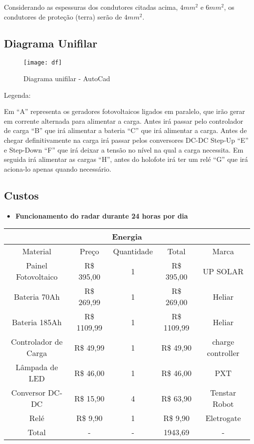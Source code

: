 Considerando as espessuras dos condutores citadas acima, $4mm^2$ e $6mm^2$, os condutores de proteção (terra) serão de $4mm^2$.

\subsection{Diagrama Unifilar}

\begin{figure}[H]
\centering
\texttt{[image: df]}
\caption{Diagrama unifilar - AutoCad}
\label{fig:5}
\end{figure}

Legenda:

Em “A” representa os geradores fotovoltaicos ligados em paralelo, que irão gerar em corrente alternada para alimentar a carga. Antes irá passar pelo controlador de carga “B” que irá alimentar a bateria “C” que irá alimentar a carga. Antes de chegar definitivamente na carga irá passar pelos conversores DC-DC Step-Up “E” e Step-Down “F” que irá deixar a tensão no nível na qual a carga necessita. Em seguida irá alimentar as cargas “H”, antes do holofote irá ter um relé “G” que irá aciona-lo apenas quando necessário.

\subsection{Custos}

\begin{itemize}
    \item \textbf{Funcionamento do radar durante 24 horas por dia}
\end{itemize}

\begin{table}[H]
\begin{tabular}{|c|c|c|c|c|}
\hline
\multicolumn{5}{|c|}{Energia}                                                 \\ \hline
Material             & Preço         & Quantidade & Total         & Marca     \\ \hline
Painel Fotovoltaico  & R\$ 395,00  & 1          & R\$ 395,00  & UP SOLAR    \\ \hline
Bateria 70Ah             & R\$ 269,99  & 1          & R\$ 269,00  & Heliar  \\ \hline
Bateria 185Ah             & R\$ 1109,99  & 1          & R\$ 1109,99  & Heliar  \\ \hline
Controlador de Carga & R\$ 49,99  & 1          & R\$ 49,90  & charge controller \\ \hline
Lâmpada de LED       & R\$ 46,00 & 1          & R\$ 46,00 & PXT         \\ \hline
Conversor DC-DC       & R\$ 15,90 & 4          & R\$ 63,90 & Tenstar Robot         \\ \hline
Relé       & R\$ 9,90 & 1          & R\$ 9,90 & Eletrogate         \\ \hline
Total & - & - & 1943,69 & - \\ \hline
\end{tabular}
\end{table}



